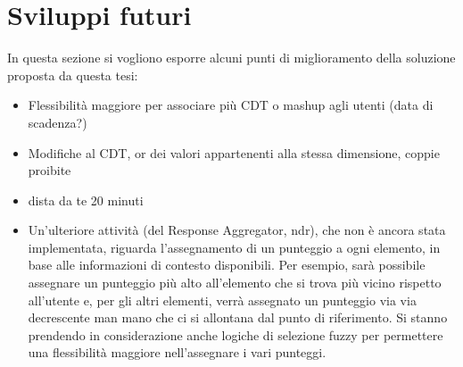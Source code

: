 \section{Sviluppi futuri}

In questa sezione si vogliono esporre alcuni punti di miglioramento della soluzione proposta da questa tesi:

\begin{itemize}
	\item
	Flessibilità maggiore per associare più CDT o mashup agli utenti (data di scadenza?)
	\item
	Modifiche al CDT, or dei valori appartenenti alla stessa dimensione, coppie proibite
	\item
	dista da te 20 minuti
	\item
	Un’ulteriore attività (del Response Aggregator, ndr), che non è ancora stata implementata, riguarda l’assegnamento di un punteggio a ogni elemento, in base alle informazioni di contesto disponibili. Per esempio, sarà possibile assegnare un punteggio più alto all’elemento che si trova più vicino rispetto all’utente e, per gli altri elementi, verrà assegnato un punteggio via via decrescente man mano che ci si allontana dal punto di riferimento. Si stanno prendendo in considerazione anche logiche di selezione fuzzy per permettere una  flessibilità maggiore nell’assegnare i vari punteggi.
\end{itemize}